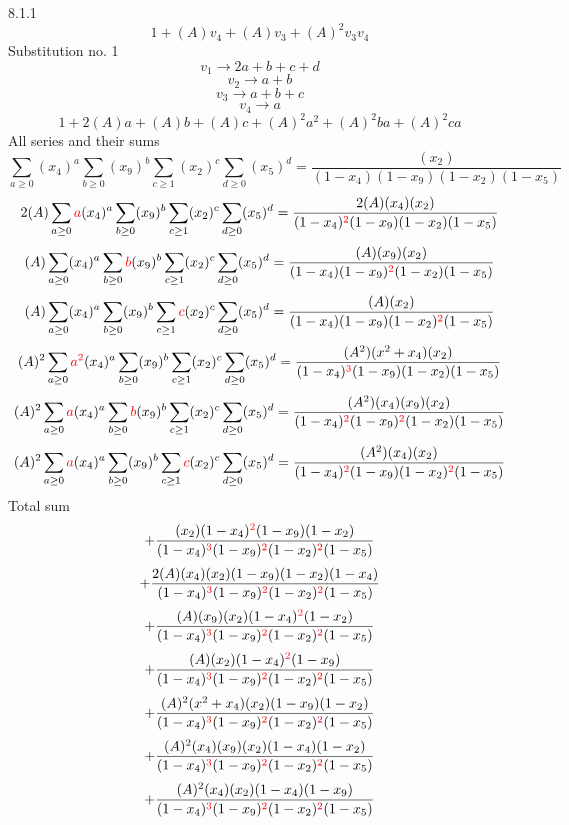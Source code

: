 \documentclass{article}
\begin{document}
                
8.1.1
\[1+(A)v_4+(A)v_3+(A)^2v_3v_4\]Substitution no. 1\[v_1\rightarrow{2a+b+c+d}\]\[v_2\rightarrow{a+b}\]\[v_3\rightarrow{a+b+c}\]\[v_4\rightarrow{a}\]\[1+2(A)a+(A)b+(A)c+(A)^2a^{2}+(A)^2ba+(A)^2ca\]All series and their sums\[\sum_{a\geq{0}}(x_4)^{a}\sum_{b\geq{0}}(x_9)^{b}\sum_{c\geq{1}}(x_2)^{c}\sum_{d\geq{0}}(x_5)^{d}=\frac{(x_2)}{(1-x_4)(1-x_9)(1-x_2)(1-x_5)}\]\[2(A)\sum_{a\geq{0}}\textcolor{red}{a}(x_4)^{a}\sum_{b\geq{0}}(x_9)^{b}\sum_{c\geq{1}}(x_2)^{c}\sum_{d\geq{0}}(x_5)^{d}=\frac{2(A)(x_4)(x_2)}{(1-x_4)^{\textcolor{red}{2}}(1-x_9)(1-x_2)(1-x_5)}\]\[(A)\sum_{a\geq{0}}(x_4)^{a}\sum_{b\geq{0}}\textcolor{red}{b}(x_9)^{b}\sum_{c\geq{1}}(x_2)^{c}\sum_{d\geq{0}}(x_5)^{d}=\frac{(A)(x_9)(x_2)}{(1-x_4)(1-x_9)^{\textcolor{red}{2}}(1-x_2)(1-x_5)}\]\[(A)\sum_{a\geq{0}}(x_4)^{a}\sum_{b\geq{0}}(x_9)^{b}\sum_{c\geq{1}}\textcolor{red}{c}(x_2)^{c}\sum_{d\geq{0}}(x_5)^{d}=\frac{(A)(x_2)}{(1-x_4)(1-x_9)(1-x_2)^{\textcolor{red}{2}}(1-x_5)}\]\[(A)^{2}\sum_{a\geq{0}}\textcolor{red}{a^{2}}(x_4)^{a}\sum_{b\geq{0}}(x_9)^{b}\sum_{c\geq{1}}(x_2)^{c}\sum_{d\geq{0}}(x_5)^{d}=\frac{(A^{2})(x^{2}+x_4)(x_2)}{(1-x_4)^{\textcolor{red}{3}}(1-x_9)(1-x_2)(1-x_5)}\]\[(A)^{2}\sum_{a\geq{0}}\textcolor{red}{a}(x_4)^{a}\sum_{b\geq{0}}\textcolor{red}{b}(x_9)^{b}\sum_{c\geq{1}}(x_2)^{c}\sum_{d\geq{0}}(x_5)^{d}=\frac{(A^{2})(x_4)(x_9)(x_2)}{(1-x_4)^{\textcolor{red}{2}}(1-x_9)^{\textcolor{red}{2}}(1-x_2)(1-x_5)}\]\[(A)^{2}\sum_{a\geq{0}}\textcolor{red}{a}(x_4)^{a}\sum_{b\geq{0}}(x_9)^{b}\sum_{c\geq{1}}\textcolor{red}{c}(x_2)^{c}\sum_{d\geq{0}}(x_5)^{d}=\frac{(A^{2})(x_4)(x_2)}{(1-x_4)^{\textcolor{red}{2}}(1-x_9)(1-x_2)^{\textcolor{red}{2}}(1-x_5)}\]
Total sum
\[+\frac{(x_2)(1-x_4)^{\textcolor{red}{2}}(1-x_9)(1-x_2)}{(1-x_4)^{\textcolor{red}{3}}(1-x_9)^{\textcolor{red}{2}}(1-x_2)^{\textcolor{red}{2}}(1-x_5)}\]\[+\frac{2(A)(x_4)(x_2)(1-x_9)(1-x_2)(1-x_4)}{(1-x_4)^{\textcolor{red}{3}}(1-x_9)^{\textcolor{red}{2}}(1-x_2)^{\textcolor{red}{2}}(1-x_5)}\]\[+\frac{(A)(x_9)(x_2)(1-x_4)^{\textcolor{red}{2}}(1-x_2)}{(1-x_4)^{\textcolor{red}{3}}(1-x_9)^{\textcolor{red}{2}}(1-x_2)^{\textcolor{red}{2}}(1-x_5)}\]\[+\frac{(A)(x_2)(1-x_4)^{\textcolor{red}{2}}(1-x_9)}{(1-x_4)^{\textcolor{red}{3}}(1-x_9)^{\textcolor{red}{2}}(1-x_2)^{\textcolor{red}{2}}(1-x_5)}\]\[+\frac{(A)^{2}(x^{2}+x_4)(x_2)(1-x_9)(1-x_2)}{(1-x_4)^{\textcolor{red}{3}}(1-x_9)^{\textcolor{red}{2}}(1-x_2)^{\textcolor{red}{2}}(1-x_5)}\]\[+\frac{(A)^{2}(x_4)(x_9)(x_2)(1-x_4)(1-x_2)}{(1-x_4)^{\textcolor{red}{3}}(1-x_9)^{\textcolor{red}{2}}(1-x_2)^{\textcolor{red}{2}}(1-x_5)}\]\[+\frac{(A)^{2}(x_4)(x_2)(1-x_4)(1-x_9)}{(1-x_4)^{\textcolor{red}{3}}(1-x_9)^{\textcolor{red}{2}}(1-x_2)^{\textcolor{red}{2}}(1-x_5)}\]
\end{document}
